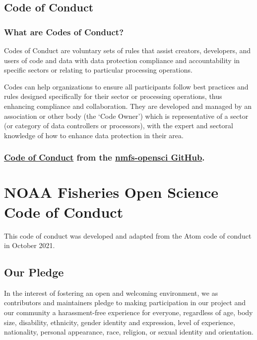 \documentclass[
  letterpaper,
  oneside,
  open=any]{scrbook}
\begin{document}
\section{Code of Conduct}\label{code-of-conduct}

\subsection{What are Codes of Conduct?}\label{what-are-codes-of-conduct}

Codes of Conduct are voluntary sets of rules that assist creators,
developers, and users of code and data with data protection compliance
and accountability in specific sectors or relating to particular
processing operations.

Codes can help organizations to ensure all participants follow best
practices and rules designed specifically for their sector or processing
operations, thus enhancing compliance and collaboration. They are
developed and managed by an association or other body (the `Code Owner')
which is representative of a sector (or category of data controllers or
processors), with the expert and sectoral knowledge of how to enhance
data protection in their area.

\subsection{\texorpdfstring{\href{https://github.com/nmfs-opensci/.github/blob/main/CODE_OF_CONDUCT.md}{Code
of Conduct} from the \href{https://nmfs-opensci.github.io/}{nmfs-opensci
GitHub}.}{Code of Conduct from the nmfs-opensci GitHub.}}\label{code-of-conduct-from-the-nmfs-opensci-github.}


\chapter{NOAA Fisheries Open Science Code of
Conduct}\label{noaa-fisheries-open-science-code-of-conduct}

This code of conduct was developed and adapted from the Atom code of
conduct in October 2021.

\section{Our Pledge}\label{our-pledge}

In the interest of fostering an open and welcoming environment, we as
contributors and maintainers pledge to making participation in our
project and our community a harassment-free experience for everyone,
regardless of age, body size, disability, ethnicity, gender identity and
expression, level of experience, nationality, personal appearance, race,
religion, or sexual identity and orientation.
\end{document}
